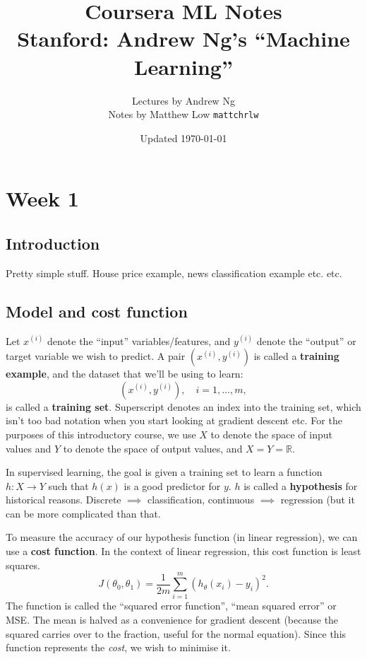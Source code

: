 \documentclass[a4paper, 10pt, oneside]{book}
\title{\bfseries\sffamily\color{blue!50!black} Coursera ML Notes\\\large Stanford: Andrew Ng's ``Machine Learning''}
\author{Lectures by Andrew Ng\\Notes by Matthew Low \texttt{mattchrlw}}
\date{Updated \today}
\begin{document}
\maketitle
\restoregeometry

\tableofcontents

\chapter{Week 1}

\section{Introduction}
Pretty simple stuff. House price example, news classification example etc. etc.

\section{Model and cost function}
Let $x^{(i)}$ denote the ``input'' variables/features, and $y^{(i)}$ denote the ``output'' or target variable we wish to predict. A pair $(x^{(i)}, y^{(i)})$ is called a \textbf{training example}, and the dataset that we'll be using to learn:
\[(x^{(i)}, y^{(i)}), \quad i = 1,\ldots, m,\]
is called a \textbf{training set}. Superscript denotes an index into the training set, which isn't too bad notation when you start looking at gradient descent etc. For the purposes of this introductory course, we use $X$ to denote the space of input values and $Y$ to denote the space of output values, and $X = Y = \mathbb R$.

In supervised learning, the goal is given a training set to learn a function $h: X \to Y$ such that $h(x)$ is a good predictor for $y$. $h$ is called a \textbf{hypothesis} for historical reasons. Discrete $\implies$ classification, continuous $\implies$ regression (but it can be more complicated than that.

To measure the accuracy of our hypothesis function (in linear regression), we can use a \textbf{cost function}. In the context of linear regression, this cost function is least squares.
\[J(\theta_0, \theta_1) = \frac{1}{2m} \sum_{i=1}^m (h_\theta(x_i) - y_i)^2.\]
The function is called the ``squared error function'', ``mean squared error'' or MSE. The mean is halved as a convenience for gradient descent (because the squared carries over to the fraction, useful for the normal equation). Since this function represents the \textit{cost}, we wish to minimise it.
\end{document}
